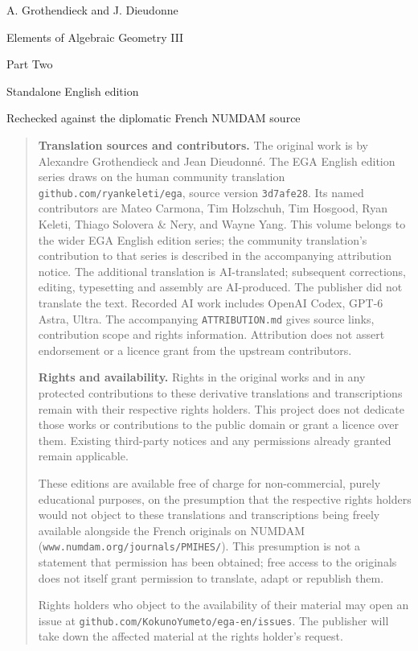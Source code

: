\documentclass[10pt,oneside]{book}
\begin{document}
\begin{titlepage}
  \centering
  {\Large A. Grothendieck and J. Dieudonne\par}
  \vfill
  {\Huge Elements of Algebraic Geometry III\par}
  \vspace{1.5ex}
  {\LARGE Part Two\par}
  \vfill
  {\large Standalone English edition\par}
  \vspace{1ex}
  {\small Rechecked against the diplomatic French NUMDAM source\par}
\end{titlepage}


\begingroup
\small
\raggedright
\begin{quote}
\textbf{Translation sources and contributors.}
The original work is by Alexandre Grothendieck and Jean Dieudonn\'e.
The EGA English edition series draws on the human community translation
\texttt{github.com/ryankeleti/ega}, source version \texttt{3d7afe28}.
Its named contributors are Mateo Carmona, Tim Holzschuh, Tim Hosgood,
Ryan Keleti, Thiago Solovera \& Nery, and Wayne Yang.
This volume belongs to the wider EGA English edition series; the community translation's contribution to that series is described in the accompanying attribution notice.
The additional translation is AI-translated; subsequent corrections, editing,
typesetting and assembly are AI-produced. The publisher did not translate
the text. Recorded AI work includes OpenAI Codex,
GPT-6 Astra, Ultra.
The accompanying \texttt{ATTRIBUTION.md} gives source links, contribution
scope and rights information. Attribution does not assert endorsement
or a licence grant from the upstream contributors.

\medskip
\textbf{Rights and availability.}
Rights in the original works and in any protected contributions to these
derivative translations and transcriptions remain with their respective
rights holders. This project does not dedicate those works or contributions
to the public domain or grant a licence over them. Existing third-party
notices and any permissions already granted remain applicable.

These editions are available free of charge for non-commercial, purely
educational purposes, on the presumption that the respective rights holders
would not object to these translations and transcriptions being freely
available alongside the French originals on NUMDAM
(\texttt{www.numdam.org/journals/PMIHES/}). This presumption is not a statement
that permission has been obtained; free access to the originals does not
itself grant permission to translate, adapt or republish them.

Rights holders who object to the availability of their material may open
an issue at \texttt{github.com/KokunoYumeto/ega-en/issues}. The publisher
will take down the affected material at the rights holder's request.
\end{quote}
\endgroup
\end{document}
